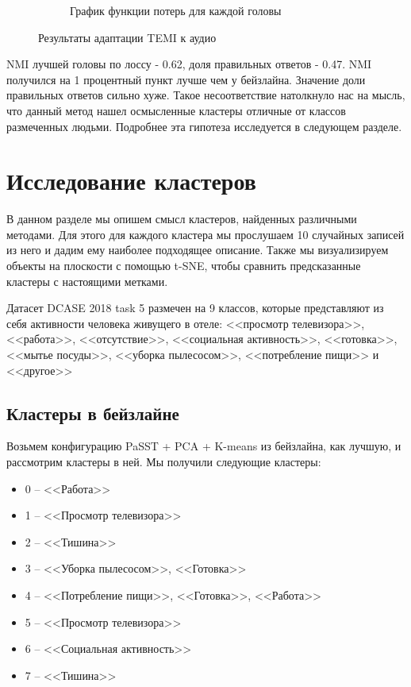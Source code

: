 \documentclass[a4paper,12pt]{extarticle}
\begin{document}
\begin{figure}[ht]
\begin{subfigure}{.5\textwidth}
        \caption{График функции потерь для каждой головы}
    \end{subfigure}
	\caption{Результаты адаптации TEMI к аудио}
	\label{fig:temi_a_graphs}
\end{figure}

\newpage

NMI лучшей головы по лоссу - 0.62, доля правильных 
ответов - 0.47. NMI получился на 1 процентный пункт лучше чем 
у бейзлайна. Значение доли правильных ответов сильно
хуже. Такое несоответствие натолкнуло нас на мысль, что 
данный метод нашел осмысленные кластеры отличные от 
классов размеченных людьми. Подробнее эта гипотеза 
исследуется в следующем разделе.

\section{Исследование кластеров}

В данном разделе мы опишем смысл кластеров, найденных 
различными методами. Для этого для каждого кластера мы прослушаем 
10 случайных записей из него и дадим ему наиболее подходящее описание.
Также мы визуализируем объекты на плоскости с помощью t-SNE, чтобы 
сравнить предсказанные кластеры с настоящими метками.

Датасет DCASE 2018 task 5 размечен на 9 классов, которые 
представляют из себя активности человека живущего в отеле:
<<просмотр телевизора>>, <<работа>>, <<отсутствие>>, <<социальная 
активность>>, <<готовка>>, <<мытье посуды>>, <<уборка пылесосом>>,
<<потребление пищи>> и <<другое>>

\subsection{Кластеры в бейзлайне}

Возьмем конфигурацию PaSST + PCA + K-means из бейзлайна, как 
лучшую, и рассмотрим кластеры в ней. Мы получили следующие
кластеры:

\begin{itemize}
    \item 0 -- <<Работа>>
    \item 1 -- <<Просмотр телевизора>>
    \item 2 -- <<Тишина>>
    \item 3 -- <<Уборка пылесосом>>, <<Готовка>>
    \item 4 -- <<Потребление пищи>>, <<Готовка>>, <<Работа>>
    \item 5 -- <<Просмотр телевизора>>
    \item 6 -- <<Социальная активность>>
    \item 7 -- <<Тишина>>
\end{itemize}
\end{document}
